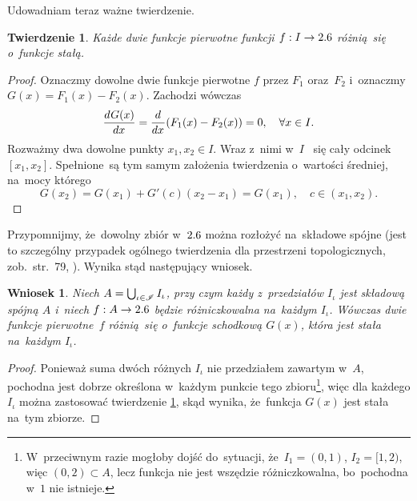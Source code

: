 \documentclass[a4paper,11pt]{article}
\newtheorem{twr}{Twierdzenie}  %
\newtheorem{wni}{Wniosek}
\begin{document}
Udowadniam teraz ważne twierdzenie.
\begin{twr}
  \label{thm:FichtenholzVolII-01}
  Każde dwie funkcje pierwotne funkcji $f: I \to 2.6$ różnią~się
  o~funkcje stałą.
\end{twr}
\begin{proof}
  Oznaczmy dowolne dwie funkcje pierwotne $f$ przez $F_{ 1 }$
  oraz~$F_{ 2 }$ i~oznaczmy $G( x ) = F_{ 1 }( x ) - F_{ 2 }( x )$.
  Zachodzi wówczas
  \begin{equation}
    \label{eq:FichtenholzVolII-06}
    \frac{ d^{   } {  G( x )  } }{ d {  x  }^{   } } = \frac{ d^{   } {   } }{ d {  x  }^{   } } ( F_{ 1 }( x ) - F_{ 2 }( x ) )
    = 0,
    \quad \forall x \in I.
  \end{equation}
  Rozważmy dwa dowolne punkty $x_{ 1 }, x_{ 2 } \in I$. Wraz z~nimi
  w~$I$ ~się cały odcinek $[ x_{ 1 }, x_{ 2 } ]$. Spełnione~są tym
  samym założenia twierdzenia o~wartości średniej, na~mocy którego
  \begin{equation}
    \label{eq:FichtenholzVolII-07}
    G( x_{ 2 } ) = G( x_{ 1 } ) + G'( c ) ( x_{ 2 } - x_{ 1 } ) = G( x_{ 1 } ),
    \quad c \in ( x_{ 1 }, x_{ 2 } ).
  \end{equation}
\end{proof}
Przypomnijmy, że~dowolny zbiór w~$2.6$ można rozłożyć na~składowe
spójne (jest to szczególny przypadek ogólnego twierdzenia dla
przestrzeni topologicznych, zob.~str.~79,
\cite{SchwartzKursAnalizyMatematycznejTomI1979}). Wynika stąd
następujący wniosek.
\begin{wni}
  \label{cor:FichtenholzVolII-01}
  Niech $A = \bigcup_{ \iota \in \mathcal{I} } I_{ \iota }$, przy czym
  każdy z~przedziałów $I_{ \iota }$ jest składową spójną $A$ i~niech
  $f: A \to 2.6$ będzie różniczkowalna na~każdym $I_{ \iota }$. Wówczas
  dwie funkcje pierwotne~$f$ różnią~się o~funkcje schodkową $G( x )$,
  która jest stała na~każdym $I_{ \iota }$.
\end{wni}
\begin{proof}
  Ponieważ suma dwóch różnych $I_{ \iota }$ nie przedziałem zawartym
  w~$A$, pochodna jest dobrze określona w~każdym punkcie tego
  zbioru\footnote{W~przeciwnym razie mogłoby dojść do~sytuacji,
    że~$I_{ 1 } = (0, 1)$, $I_{ 2 } = [ 1, 2 )$, więc
    $( 0, 2 ) \subset A$, lecz funkcja nie jest wszędzie
    różniczkowalna, bo~pochodna w~$1$ nie istnieje.}, więc dla każdego
  $I_{ \iota }$ można zastosować twierdzenie
  \ref{thm:FichtenholzVolII-01}, skąd wynika, że~funkcja $G( x )$ jest
  stała na~tym zbiorze.
\end{proof}
\end{document}
